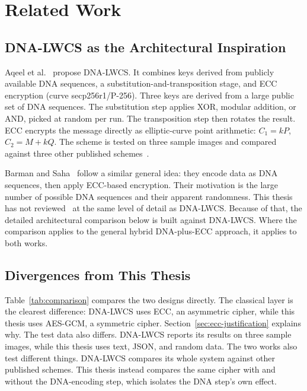 \documentclass[12pt,a4paper,twoside]{report}
\numberwithin{equation}{chapter}
\begin{document}
\chapter{Related Work}
\label{ch:related}

\section{DNA-LWCS as the Architectural Inspiration}
Aqeel et al.~\cite{aqeel2025} propose DNA-LWCS. It combines keys
derived from publicly available DNA sequences, a
substitution-and-transposition stage, and ECC encryption (curve
secp256r1/P-256). Three keys are derived from a large public set of DNA
sequences. The substitution step applies XOR, modular addition, or AND,
picked at random per run. The transposition step then rotates the
result. ECC encrypts the message directly as elliptic-curve point
arithmetic: $C_1 = kP$, $C_2 = M + kQ$. The scheme is tested on three
sample images and compared against three other published
schemes~\cite{aqeel2025}.

Barman and Saha~\cite{dnaecc} follow a similar general idea: they encode
data as DNA sequences, then apply ECC-based encryption. Their motivation
is the large number of possible DNA sequences and their apparent
randomness. This thesis has not reviewed~\cite{dnaecc} at the same level
of detail as DNA-LWCS. Because of that, the detailed architectural
comparison below is built against DNA-LWCS. Where the comparison applies
to the general hybrid DNA-plus-ECC approach, it applies to both works.

\section{Divergences from This Thesis}
Table~\ref{tab:comparison} compares the two designs directly. The
classical layer is the clearest difference: DNA-LWCS uses ECC, an
asymmetric cipher, while this thesis uses AES-GCM, a symmetric cipher.
Section~\ref{sec:ecc-justification} explains why. The test data also
differs. DNA-LWCS reports its results on three sample images, while
this thesis uses text, JSON, and random data. The two works also test
different things. DNA-LWCS compares its whole system against other
published schemes. This thesis instead compares the same cipher with
and without the DNA-encoding step, which isolates the DNA step's own
effect.
\end{document}
